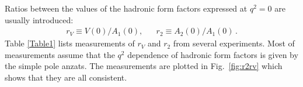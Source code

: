 Ratios between the values of the hadronic form factors expressed at $q^2=0$ are usually introduced:
\begin{eqnarray}
r_V \equiv V(0) / A_1(0), & &  r_2 \equiv A_2(0) / A_1(0) \label{rVr2_eq}\,.
\end{eqnarray}
Table \ref{Table1} lists measurements of $r_V$ and $r_2$ from several
experiments. Most of measurements assume that the $q^2$ dependence of hadronic form factors 
is given by the simple pole anzats.
The measurements are plotted in
Fig.~\ref{fig:r2rv} which shows that they are all consistent.

